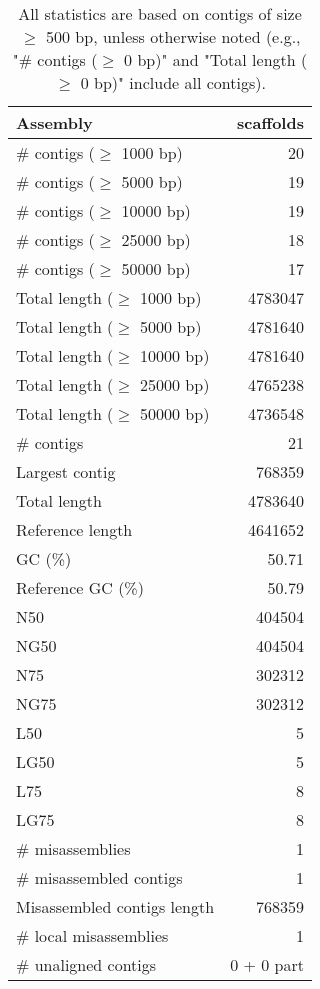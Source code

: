 \documentclass[12pt,a4paper]{article}
\begin{document}
\begin{table}[ht]
\begin{center}
\caption{All statistics are based on contigs of size $\geq$ 500 bp, unless otherwise noted (e.g., "\# contigs ($\geq$ 0 bp)" and "Total length ($\geq$ 0 bp)" include all contigs).}
\begin{tabular}{|l*{1}{|r}|}
\hline
Assembly & scaffolds \\ \hline
\# contigs ($\geq$ 1000 bp) & 20 \\ \hline
\# contigs ($\geq$ 5000 bp) & 19 \\ \hline
\# contigs ($\geq$ 10000 bp) & 19 \\ \hline
\# contigs ($\geq$ 25000 bp) & 18 \\ \hline
\# contigs ($\geq$ 50000 bp) & 17 \\ \hline
Total length ($\geq$ 1000 bp) & 4783047 \\ \hline
Total length ($\geq$ 5000 bp) & 4781640 \\ \hline
Total length ($\geq$ 10000 bp) & 4781640 \\ \hline
Total length ($\geq$ 25000 bp) & 4765238 \\ \hline
Total length ($\geq$ 50000 bp) & 4736548 \\ \hline
\# contigs & 21 \\ \hline
Largest contig & 768359 \\ \hline
Total length & 4783640 \\ \hline
Reference length & 4641652 \\ \hline
GC (\%) & 50.71 \\ \hline
Reference GC (\%) & 50.79 \\ \hline
N50 & 404504 \\ \hline
NG50 & 404504 \\ \hline
N75 & 302312 \\ \hline
NG75 & 302312 \\ \hline
L50 & 5 \\ \hline
LG50 & 5 \\ \hline
L75 & 8 \\ \hline
LG75 & 8 \\ \hline
\# misassemblies & 1 \\ \hline
\# misassembled contigs & 1 \\ \hline
Misassembled contigs length & 768359 \\ \hline
\# local misassemblies & 1 \\ \hline
\# unaligned contigs & 0 + 0 part \\ \hline

\end{tabular}
\end{center}
\end{table}
\end{document}
